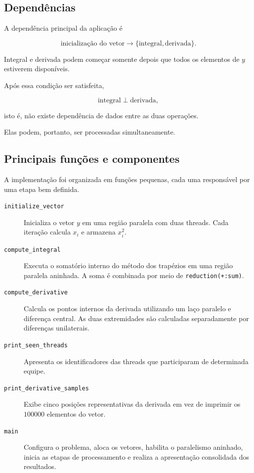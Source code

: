 \subsection{Dependências}

A dependência principal da aplicação é

\[
\text{inicialização do vetor}
\rightarrow
\{\text{integral},\text{derivada}\}.
\]

Integral e derivada podem começar somente depois que todos os elementos de
$y$ estiverem disponíveis.

Após essa condição ser satisfeita,

\[
\text{integral}
\perp
\text{derivada},
\]

isto é, não existe dependência de dados entre as duas operações.

Elas podem, portanto, ser processadas simultaneamente.


\subsection{Principais funções e componentes}

A implementação foi organizada em funções pequenas, cada uma responsável por
uma etapa bem definida.

\begin{description}

    \item[\texttt{initialize\_vector}]
    Inicializa o vetor $y$ em uma região paralela com duas threads. Cada
    iteração calcula $x_i$ e armazena $x_i^2$.

    \item[\texttt{compute\_integral}]
    Executa o somatório interno do método dos trapézios em uma região
    paralela aninhada. A soma é combinada por meio de
    \texttt{reduction(+:sum)}.

    \item[\texttt{compute\_derivative}]
    Calcula os pontos internos da derivada utilizando um laço paralelo e
    diferença central. As duas extremidades são calculadas separadamente por
    diferenças unilaterais.

    \item[\texttt{print\_seen\_threads}]
    Apresenta os identificadores das threads que participaram de determinada
    equipe.

    \item[\texttt{print\_derivative\_samples}]
    Exibe cinco posições representativas da derivada em vez de imprimir os
    $100000$ elementos do vetor.

    \item[\texttt{main}]
    Configura o problema, aloca os vetores, habilita o paralelismo aninhado,
    inicia as etapas de processamento e realiza a apresentação consolidada dos
    resultados.

\end{description}

